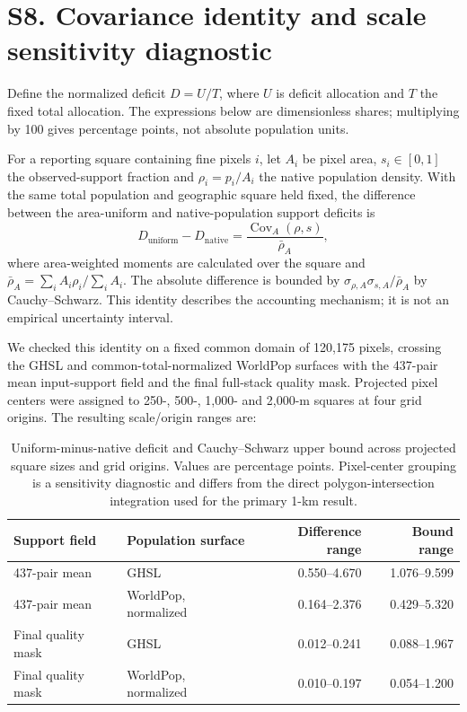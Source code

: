 \documentclass[10pt,a4paper]{article}
\begin{document}
\section*{S8. Covariance identity and scale sensitivity diagnostic}
Define the normalized deficit $D=U/T$, where $U$ is deficit allocation and $T$ the fixed total allocation. The expressions below are dimensionless shares; multiplying by 100 gives percentage points, not absolute population units.

For a reporting square containing fine pixels $i$, let $A_i$ be pixel area, $s_i\in[0,1]$ the observed-support fraction and $\rho_i=p_i/A_i$ the native population density. With the same total population and geographic square held fixed, the difference between the area-uniform and native-population support deficits is
\begin{equation}
D_{\mathrm{uniform}}-D_{\mathrm{native}}
=\frac{\operatorname{Cov}_{A}(\rho,s)}{\bar{\rho}_{A}},
\end{equation}
where area-weighted moments are calculated over the square and $\bar{\rho}_{A}=\sum_i A_i\rho_i/\sum_i A_i$. The absolute difference is bounded by $\sigma_{\rho,A}\sigma_{s,A}/\bar{\rho}_{A}$ by Cauchy--Schwarz. This identity describes the accounting mechanism; it is not an empirical uncertainty interval.

We checked this identity on a fixed common domain of 120,175 pixels, crossing the GHSL and common-total-normalized WorldPop surfaces with the 437-pair mean input-support field and the final full-stack quality mask. Projected pixel centers were assigned to 250-, 500-, 1,000- and 2,000-m squares at four grid origins. The resulting scale/origin ranges are:

\begin{table}[htbp]\centering\small
\caption{Uniform-minus-native deficit and Cauchy--Schwarz upper bound across projected square sizes and grid origins. Values are percentage points. Pixel-center grouping is a sensitivity diagnostic and differs from the direct polygon-intersection integration used for the primary 1-km result.}
\begin{tabular}{llrr}\toprule
Support field & Population surface & Difference range & Bound range \\
\midrule
437-pair mean & GHSL & 0.550--4.670 & 1.076--9.599 \\
437-pair mean & WorldPop, normalized & 0.164--2.376 & 0.429--5.320 \\
Final quality mask & GHSL & 0.012--0.241 & 0.088--1.967 \\
Final quality mask & WorldPop, normalized & 0.010--0.197 & 0.054--1.200 \\
\bottomrule\end{tabular}
\end{table}
\end{document}
